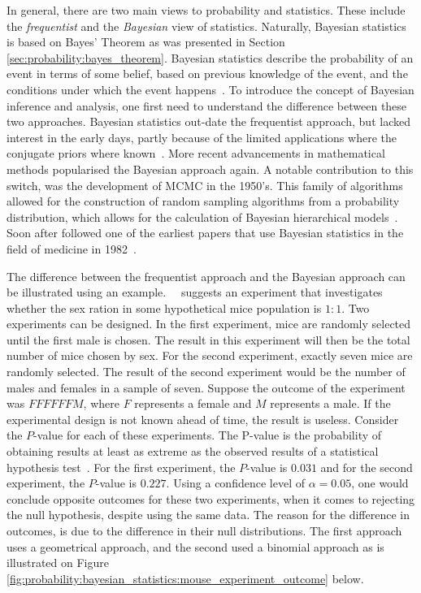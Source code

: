 In general, there are two main views to probability and statistics. These include the \textit{frequentist} and the \textit{Bayesian} view of statistics. Naturally, Bayesian statistics is based on Bayes' Theorem as was presented in Section \ref{sec:probability:bayes_theorem}. Bayesian statistics describe the probability of an event in terms of some belief, based on previous knowledge of the event, and the conditions under which the event happens~\cite{ref:hackenberger:2019}. To introduce the concept of Bayesian inference and analysis, one first need to understand the difference between these two approaches. Bayesian statistics out-date the frequentist approach, but lacked interest in the early days, partly because of the limited applications where the conjugate priors where known~\cite{ref:hackenberger:2019}. More recent advancements in mathematical methods popularised the Bayesian approach again. A notable contribution to this switch, was the development of \acf{MCMC} in the 1950's. This family of algorithms allowed for the construction of random sampling algorithms from a probability distribution, which allows for the calculation of Bayesian hierarchical models~\cite{ref:hackenberger:2019}. Soon after followed one of the earliest papers that use Bayesian statistics in the field of medicine in 1982~\cite{ref:ashby:2006}.

The difference between the frequentist approach and the Bayesian approach can be illustrated using an example.~\citeauthor{ref:hackenberger:2019}~\cite{ref:hackenberger:2019} suggests an experiment that investigates whether the sex ration in some hypothetical mice population is $1:1$. Two experiments can be designed. In the first experiment, mice are randomly selected until the first male is chosen. The result in this experiment will then be the total number of mice chosen by sex. For the second experiment, exactly seven mice are randomly selected. The result of the second experiment would be the number of males and females in a sample of seven. Suppose the outcome of the experiment was $FFFFFFM$, where $F$ represents a female and $M$ represents a male. If the experimental design is not known ahead of time, the result is useless. Consider the $P$-value for each of these experiments. The P-value is the probability of obtaining results at least as extreme as the observed results of a statistical hypothesis test~\cite{ref:beers:2022}. For the first experiment, the $P$-value is $0.031$ and for the second experiment, the $P$-value is $0.227$. Using a confidence level of $\alpha = 0.05$, one would conclude opposite outcomes for these two experiments, when it comes to rejecting the null hypothesis, despite using the same data. The reason for the difference in outcomes, is due to the difference in their null distributions. The first approach uses a geometrical approach, and the second used a binomial approach as is illustrated on Figure \ref{fig:probability:bayesian_statistics:mouse_experiment_outcome} below.

